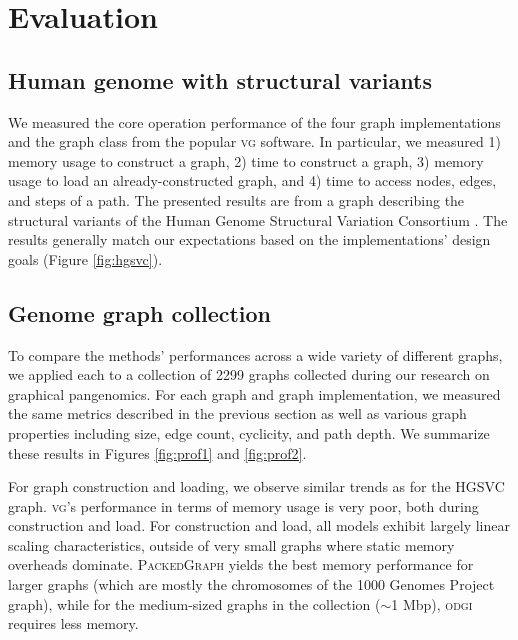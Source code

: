 \documentclass{article}
\begin{document}

\section{Evaluation}

\subsection{Human genome with structural variants}

We measured the core operation performance of the four graph implementations and the graph class from the popular \textsc{vg} software.
In particular, we measured 1) memory usage to construct a graph, 2) time to construct a graph, 3) memory usage to load an already-constructed graph, and 4) time to access nodes, edges, and steps of a path.
The presented results are from a graph describing the structural variants of the Human Genome Structural Variation Consortium \cite{chaisson2019multi}.
The results generally match our expectations based on the implementations' design goals (Figure \ref{fig:hgsvc}).

\subsection{Genome graph collection}

To compare the methods' performances across a wide variety of different graphs, we applied each to a collection of 2299 graphs collected during our research on graphical pangenomics.
For each graph and graph implementation, we measured the same metrics described in the previous section as well as various graph properties including size, edge count, cyclicity, and path depth.
We summarize these results in Figures \ref{fig:prof1} and \ref{fig:prof2}.

For graph construction and loading, we observe similar trends as for the HGSVC graph.
\textsc{vg}'s performance in terms of memory usage is very poor, both during construction and load.
For construction and load, all models exhibit largely linear scaling characteristics, outside of very small graphs where static memory overheads dominate.
\textsc{PackedGraph} yields the best memory performance for larger graphs (which are mostly the chromosomes of the 1000 Genomes Project graph), while for the medium-sized graphs in the collection ($\sim$1 Mbp), \textsc{odgi} requires less memory.
\end{document}
